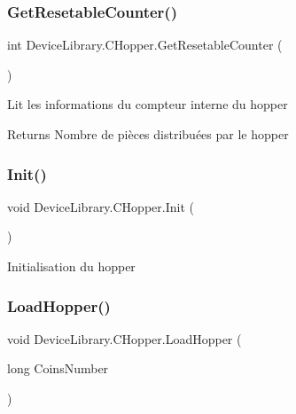 \subsubsection{\texorpdfstring{Get\+Resetable\+Counter()}{GetResetableCounter()}}
{\footnotesize\ttfamily int Device\+Library.\+C\+Hopper.\+Get\+Resetable\+Counter (\begin{DoxyParamCaption}{ }\end{DoxyParamCaption})\hspace{0.3cm}{\ttfamily [inline]}}



Lit les informations du compteur interne du hopper 

\begin{DoxyReturn}{Returns}
Nombre de pièces distribuées par le hopper
\end{DoxyReturn}
\mbox{\label{class_device_library_1_1_c_hopper_aa47c51849127934ffa8b0fd19a46344a}} 
\subsubsection{\texorpdfstring{Init()}{Init()}}
{\footnotesize\ttfamily void Device\+Library.\+C\+Hopper.\+Init (\begin{DoxyParamCaption}{ }\end{DoxyParamCaption})\hspace{0.3cm}{\ttfamily [inline]}}



Initialisation du hopper 

\mbox{\label{class_device_library_1_1_c_hopper_aa36d7fe76437086718eee22bc8189d3b}} 
\subsubsection{\texorpdfstring{Load\+Hopper()}{LoadHopper()}}
{\footnotesize\ttfamily void Device\+Library.\+C\+Hopper.\+Load\+Hopper (\begin{DoxyParamCaption}\item[{long}]{Coins\+Number }\end{DoxyParamCaption})\hspace{0.3cm}{\ttfamily [inline]}}



